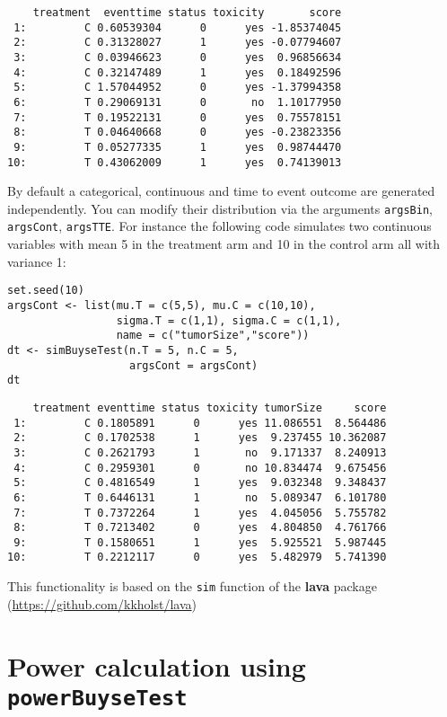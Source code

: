 \documentclass[12pt]{article}
\begin{document}
\begin{verbatim}
    treatment  eventtime status toxicity       score
 1:         C 0.60539304      0      yes -1.85374045
 2:         C 0.31328027      1      yes -0.07794607
 3:         C 0.03946623      0      yes  0.96856634
 4:         C 0.32147489      1      yes  0.18492596
 5:         C 1.57044952      0      yes -1.37994358
 6:         T 0.29069131      0       no  1.10177950
 7:         T 0.19522131      0      yes  0.75578151
 8:         T 0.04640668      0      yes -0.23823356
 9:         T 0.05277335      1      yes  0.98744470
10:         T 0.43062009      1      yes  0.74139013
\end{verbatim}

By default a categorical, continuous and time to event outcome are
generated independently. You can modify their distribution via the
arguments \texttt{argsBin}, \texttt{argsCont}, \texttt{argsTTE}. For instance the following
code simulates two continuous variables with mean 5 in the treatment
arm and 10 in the control arm all with variance 1:
\lstset{language=r,label= ,caption= ,captionpos=b,numbers=none}
\begin{lstlisting}
set.seed(10)
argsCont <- list(mu.T = c(5,5), mu.C = c(10,10), 
				 sigma.T = c(1,1), sigma.C = c(1,1),
				 name = c("tumorSize","score"))
dt <- simBuyseTest(n.T = 5, n.C = 5,
				   argsCont = argsCont)
dt
\end{lstlisting}

\begin{verbatim}
    treatment eventtime status toxicity tumorSize     score
 1:         C 0.1805891      0      yes 11.086551  8.564486
 2:         C 0.1702538      1      yes  9.237455 10.362087
 3:         C 0.2621793      1       no  9.171337  8.240913
 4:         C 0.2959301      0       no 10.834474  9.675456
 5:         C 0.4816549      1      yes  9.032348  9.348437
 6:         T 0.6446131      1       no  5.089347  6.101780
 7:         T 0.7372264      1      yes  4.045056  5.755782
 8:         T 0.7213402      0      yes  4.804850  4.761766
 9:         T 0.1580651      1      yes  5.925521  5.987445
10:         T 0.2212117      0      yes  5.482979  5.741390
\end{verbatim}

This functionality is based on the \texttt{sim} function of the \textbf{lava}
package (\url{https://github.com/kkholst/lava})

\clearpage

\section{Power calculation using \texttt{powerBuyseTest}}
\label{sec:orgf4f07b7}
\end{document}
